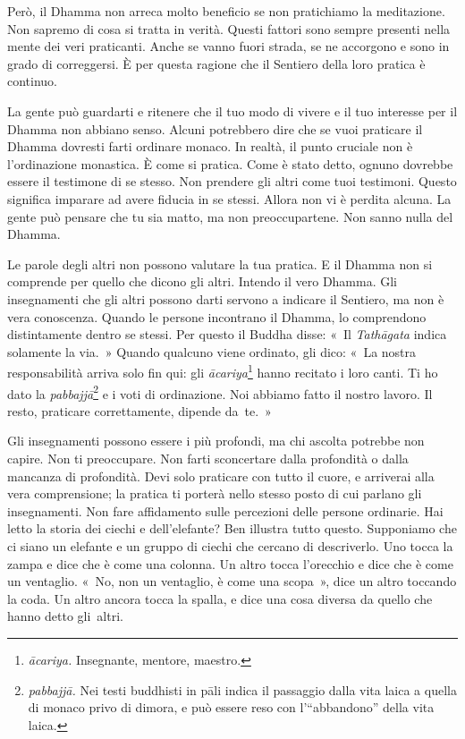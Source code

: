 Però, il Dhamma non arreca molto beneficio se non pratichiamo la
meditazione. Non sapremo di cosa si tratta in verità. Questi fattori
sono sempre presenti nella mente dei veri praticanti. Anche se vanno
fuori strada, se ne accorgono e sono in grado di correggersi. È per
questa ragione che il Sentiero della loro pratica è continuo.

La gente può guardarti e ritenere che il tuo modo di vivere e il tuo
interesse per il Dhamma non abbiano senso. Alcuni potrebbero dire che se
vuoi praticare il Dhamma dovresti farti ordinare monaco. In realtà, il
punto cruciale non è l'ordinazione monastica. È come si pratica. Come è
stato detto, ognuno dovrebbe essere il testimone di se stesso. Non
prendere gli altri come tuoi testimoni. Questo significa imparare ad
avere fiducia in se stessi. Allora non vi è perdita alcuna. La gente può
pensare che tu sia matto, ma non preoccupartene. Non sanno nulla del
Dhamma.

Le parole degli altri non possono valutare la tua pratica. E il Dhamma
non si comprende per quello che dicono gli altri. Intendo il vero
Dhamma. Gli insegnamenti che gli altri possono darti servono a indicare
il Sentiero, ma non è vera conoscenza. Quando le persone incontrano il
Dhamma, lo comprendono distintamente dentro se stessi. Per questo il
Buddha disse: «~Il \emph{Tathāgata} indica solamente la via.~» Quando
qualcuno viene ordinato, gli dico: «~La nostra responsabilità arriva
solo fin qui: gli \emph{ācariya}\footnote{\emph{ācariya.} Insegnante,
  mentore, maestro.} hanno recitato i loro canti. Ti ho dato la
\emph{pabbajjā}\footnote{\emph{pabbajjā.} Nei testi
  buddhisti in pāli indica il passaggio dalla vita laica a quella di
  monaco privo di dimora, e può essere reso con l'``abbandono'' della
  vita laica.} e i voti di ordinazione. Noi abbiamo fatto il nostro
lavoro. Il resto, praticare correttamente, dipende da~te.~»

Gli insegnamenti possono essere i più profondi, ma chi ascolta potrebbe
non capire. Non ti preoccupare. Non farti sconcertare dalla profondità o
dalla mancanza di profondità. Devi solo praticare con tutto il cuore, e
arriverai alla vera comprensione; la pratica ti porterà nello stesso
posto di cui parlano gli insegnamenti. Non fare affidamento sulle
percezioni delle persone ordinarie. Hai letto la storia dei ciechi e
dell'elefante? Ben illustra tutto questo. Supponiamo che ci siano un
elefante e un gruppo di ciechi che cercano di descriverlo. Uno tocca la
zampa e dice che è come una colonna. Un altro tocca l'orecchio e dice
che è come un ventaglio. «~No, non un ventaglio, è come una scopa~»,
dice un altro toccando la coda. Un altro ancora tocca la spalla, e dice
una cosa diversa da quello che hanno detto gli~altri.

